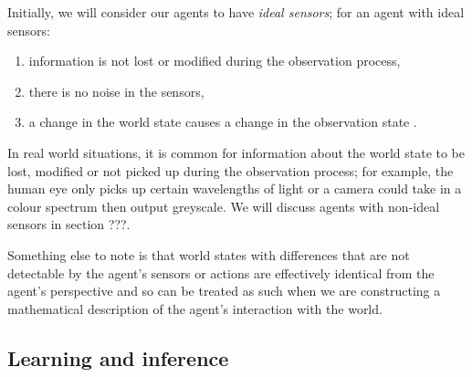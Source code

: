 Initially, we will consider our agents to have \emph{ideal sensors}; for an agent with ideal sensors:
\begin{enumerate}[(1)]
    \item information is not lost or modified during the observation process,
    \item there is no noise in the sensors, 
    \item a change in the world state causes a change in the observation state  .
\end{enumerate}

In real world situations, it is common for information about the world state to be lost, modified or not picked up during the observation process; for example, the human eye only picks up certain wavelengths of light or a camera could take in a colour spectrum then output greyscale.
We will discuss agents with non-ideal sensors in section ???.

Something else to note is that world states with differences that are not detectable by the agent's sensors or actions are effectively identical from the agent's perspective and so can be treated as such when we are constructing a mathematical description of the agent's interaction with the world.

\subsection{Learning and inference}

